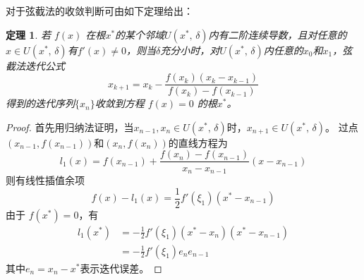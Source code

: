 \documentclass[11pt]{article}
\newtheorem{Theorem}{定理}
\begin{document}
对于弦截法的收敛判断可由如下定理给出\cite{2005数值分析}：
\begin{Theorem}
    若 $f(x)$ 在根$x^*$的某个邻域$U(x^*,\, \delta)$内有二阶连续导数，且对任意的$x \in U(x^*,\, \delta)$有$f'(x) \neq 0$，则当$\delta$充分小时，对$U(x^*,\, \delta)$内任意的$x_0$和$x_1$，弦截法迭代公式
    \begin{equation}
        x_{k + 1} = x_k - \frac{f(x_k)(x_k - x_{k - 1})}{f(x_k) - f(x_{k - 1})} \label{1} \tag{1}
    \end{equation}
    得到的迭代序列$\{x_n\}$收敛到方程 $f(x) = 0$ 的根$x^*$。
\end{Theorem}
\begin{proof}
    首先用归纳法证明，当$x_{n - 1}, x_n \in U(x^*,\, \delta)$时，$x_{n + 1} \in U(x^*,\, \delta)$。
    过点$(x_{n - 1}, f(x_{n - 1}))$和$(x_{n}, f(x_{n}))$的直线方程为
    \begin{equation*}
        l_1(x) = f(x_{n - 1}) + \frac{f(x_n) - f(x_{n - 1})}{x_n - x_{n - 1}}(x - x_{n - 1})
    \end{equation*}
    则有线性插值余项
    \begin{equation*}
        f(x) - l_1(x) = \frac{1}{2}f'(\xi_1)(x^* - x_{n - 1})
    \end{equation*}
    由于 $f(x^*) = 0$，有
    \begin{align*}
        l_1(x^*) & = -\frac{1}{2} f'(\xi_1)(x^* - x_n)(x^* - x_{n - 1})  \\
                 & = -\frac{1}{2}f'(\xi_1)e_ne_{n - 1} \label{2} \tag{2}
    \end{align*}
    其中$e_n = x_n - x^*$表示迭代误差。


\end{proof}
\end{document}
